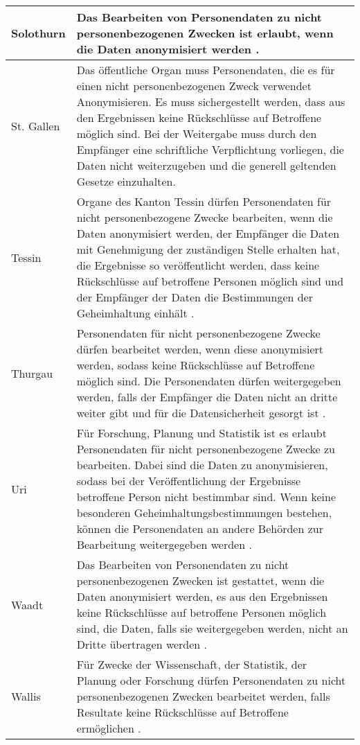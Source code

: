 \begin{longtable}{| p{} | p{}|}
		\hline
		Solothurn & Das Bearbeiten von Personendaten zu nicht personenbezogenen Zwecken ist erlaubt, wenn die Daten anonymisiert werden \parencite[§§ 16 Abs 3]{DSSGSO}. \\
    \hline
		St. Gallen & Das öffentliche Organ muss Personendaten, die es für einen nicht personenbezogenen Zweck verwendet Anonymisieren. Es muss sichergestellt werden, dass aus den Ergebnissen keine Rückschlüsse auf Betroffene möglich sind. Bei der Weitergabe muss durch den Empfänger eine schriftliche Verpflichtung vorliegen, die Daten nicht weiterzugeben und die generell geltenden Gesetze einzuhalten\parencite[§§ 7 Abs 1-3]{DSSGSG}. \\
		\hline
		Tessin & Organe des Kanton Tessin dürfen Personendaten für nicht personenbezogene Zwecke bearbeiten, wenn die Daten anonymisiert werden, der Empfänger die Daten mit Genehmigung der zuständigen Stelle erhalten hat, die Ergebnisse so veröffentlicht werden, dass keine Rückschlüsse auf betroffene Personen möglich sind und der Empfänger der Daten die Bestimmungen der Geheimhaltung einhält \parencite[§§ 15 Abs 1-2]{DSSGTI}. \\
		\hline
		Thurgau & Personendaten für nicht personenbezogene Zwecke dürfen bearbeitet werden, wenn diese anonymisiert werden, sodass keine Rückschlüsse auf Betroffene möglich sind. Die Personendaten dürfen weitergegeben werden, falls der Empfänger die Daten nicht an dritte weiter gibt und für die Datensicherheit gesorgt ist \parencite[§§ 11 Abs 1-3]{DSSGTG}. \\
		\hline
		Uri & Für Forschung, Planung und Statistik ist es erlaubt Personendaten für nicht personenbezogene Zwecke zu bearbeiten. Dabei sind die Daten zu anonymisieren, sodass bei der Veröffentlichung der Ergebnisse betroffene Person nicht bestimmbar sind. Wenn keine besonderen Geheimhaltungsbestimmungen bestehen, können die Personendaten an andere Behörden zur Bearbeitung weitergegeben werden \parencite[§§ 10 Abs. 1-2]{DSSGUR}. \\
		\hline
    Waadt & Das Bearbeiten von Personendaten zu nicht personenbezogenen Zwecken ist gestattet, wenn die Daten anonymisiert werden, es aus den Ergebnissen keine Rückschlüsse auf betroffene Personen möglich sind, die Daten, falls sie weitergegeben werden, nicht an Dritte übertragen werden \parencite[§§ 24 Abs 1-3]{DSSGVD}. \\
		\hline
    Wallis & Für Zwecke der Wissenschaft, der Statistik, der Planung oder Forschung dürfen Personendaten zu nicht personenbezogenen Zwecken bearbeitet werden, falls Resultate keine Rückschlüsse auf Betroffene ermöglichen \parencite[§§ 26 Abs. 1]{DSSGVS}.  \\

\end{longtable}
